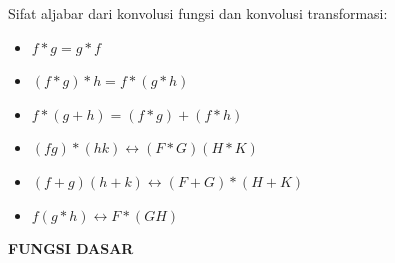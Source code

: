 \documentclass{article}
\begin{document}
Sifat aljabar dari konvolusi fungsi dan konvolusi transformasi:
\begin{itemize}
    \item $f*g = g*f$
    \item $(f*g)*h = f*(g*h)$
    \item $f*(g+h) = (f*g)+(f*h)$
    \item $(fg)*(hk) \leftrightarrow (F*G)(H*K)$
    \item $(f+g)(h+k) \leftrightarrow (F+G)*(H+K)$
    \item $f(g*h) \leftrightarrow F*(GH)$
\end{itemize}



\newpage
\begin{center}
    \textbf{FUNGSI DASAR}
\end{center}
\leavevmode\\
\end{document}

